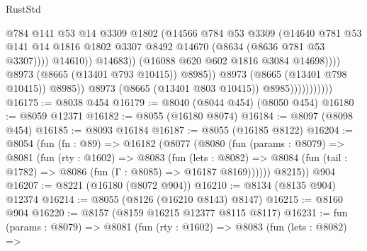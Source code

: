 \begin{lexlean}{RustStd}
\begin{coremodule}
                                                @784
                                                @141
                                                @53
                                                @14
                                                @3309
                                                @1802
                                                (@14566
                                                  @784
                                                  @53
                                                  @3309
                                                  (@14640
                                                    @781
                                                    @53
                                                    @141
                                                    @14
                                                    @1816
                                                    @1802
                                                    @3307
                                                    @8492
                                                    @14670
                                                    (@8634 (@8636 @781 @53 @3307))))
                                                @14610))
                                            @14683))
                                        (@16088 @620 @602 @1816 @3084 @14698))))
                                  @8973
                                  (@8665 (@13401 @793 @10415))
                                  @8985))
                              @8973
                              (@8665 (@13401 @798 @10415))
                              @8985))
                          @8973
                          (@8665 (@13401 @803 @10415))
                          @8985)))))))))))
@16175 := @8038 @454
@16179 := @8040 (@8044 @454) (@8050 @454)
@16180 := @8059 @12371
@16182 := @8055 (@16180 @8074)
@16184 := @8097 (@8098 @454)
@16185 := @8093 @16184
@16187 := @8055 (@16185 @8122)
@16204 := @8054
    (fun (fn : @89) =>
    @16182
      (@8077
        (@8080
          (fun (params : @8079) =>
          @8081
            (fun (rty : @1602) =>
            @8083
              (fun (lets : @8082) =>
              @8084 (fun (tail : @1782) => @8086 (fun (Γ : @8085) => @16187 @8169))))))
        @8215))
    @904
@16207 := @8221 (@16180 (@8072 @904))
@16210 := @8134 (@8135 @904) @12374
@16214 := @8055 (@8126 (@16210 @8143) @8147)
@16215 := @8160 @904
@16220 := @8157 (@8159 @16215 @12377 @8115 @8117)
@16231 := fun (params : @8079) =>
  @8081
    (fun (rty : @1602) =>
    @8083
      (fun (lets : @8082) =>

\end{coremodule}
\end{lexlean}
